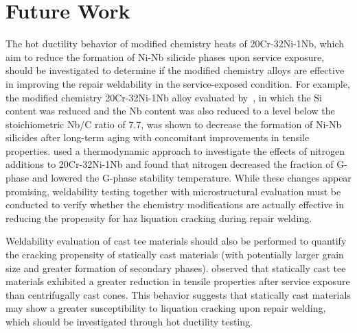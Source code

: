 \chapter{Future Work} \label{ch:future-work}
The hot ductility behavior of modified chemistry heats of 20Cr-32Ni-1Nb, which aim to reduce the formation of Ni-Nb silicide phases upon service exposure, should be investigated to determine if the modified chemistry alloys are effective in improving the repair weldability in the service-exposed condition. For example, the modified chemistry 20Cr-32Ni-1Nb alloy evaluated by~\citet{hoffman_cast_2003}, in which the Si content was reduced and the Nb content was also reduced to a level below the stoichiometric Nb/C ratio of 7.7, was shown to decrease the formation of Ni-Nb silicides after long-term aging with concomitant improvements in tensile properties. \citet{dewar_correlation_2013} used a thermodynamic approach to investigate the effects of nitrogen additions to 20Cr-32Ni-1Nb and found that nitrogen decreased the fraction of G-phase and lowered the G-phase stability temperature. While these changes appear promising, weldability testing together with microstructural evaluation must be conducted to verify whether the chemistry modifications are actually effective in reducing the propensity for \gls{haz} liquation cracking during repair welding.

Weldability evaluation of cast tee materials should also be performed to quantify the cracking propensity of statically cast materials (with potentially larger grain size and greater formation of secondary phases). \citet{hoffman_high_2000-1} observed that statically cast tee materials exhibited a greater reduction in tensile properties after service exposure than centrifugally cast cones. This behavior suggests that statically cast materials may show a greater susceptibility to liquation cracking upon repair welding, which should be investigated through hot ductility testing.


